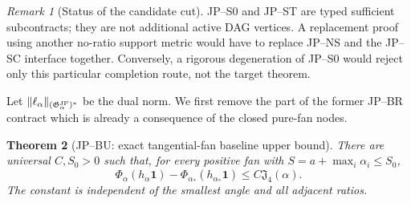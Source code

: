 \documentclass[11pt]{amsart}
\numberwithin{equation}{section}
\newtheorem{theorem}{Theorem}[section]
\theoremstyle{definition}
\theoremstyle{remark}
\newtheorem{remark}[theorem]{Remark}
\newcommand{\Jfour}{\mathfrak J_4}
\newcommand{\Gjp}{\mathfrak G^{\rm JP}}
\begin{document}
\begin{remark}[Status of the candidate cut]
JP--S0 and JP--ST are typed sufficient subcontracts; they are not
additional active DAG vertices.  A replacement proof using another
no-ratio support metric would have to replace JP--NS and the JP--SC
interface together.  Conversely, a rigorous degeneration of JP--S0 would
reject only this particular completion route, not the target theorem.
\end{remark}

Let $\|\ell_\alpha\|_{(\Gjp_\alpha)^*}$ be the dual norm.  We first remove
the part of the former JP--BR contract which is already a consequence of
the closed pure-fan nodes.

\begin{theorem}[JP--BU: exact tangential-fan baseline upper bound]
\label{JP:thm:BU}
There are universal $C,S_0>0$ such that, for every positive fan with
$S=a+\max_i\alpha_i\le S_0$,
\begin{equation}\label{JP:eq:fan-upper}
 \boxed{
 \Phi_\alpha(h_\alpha\mathbf1)
       -\Phi_{\alpha_*}(h_{\alpha_*}\mathbf1)
 \le C\Jfour(\alpha).}
\end{equation}
The constant is independent of the smallest angle and all adjacent ratios.
\end{theorem}
\end{document}
